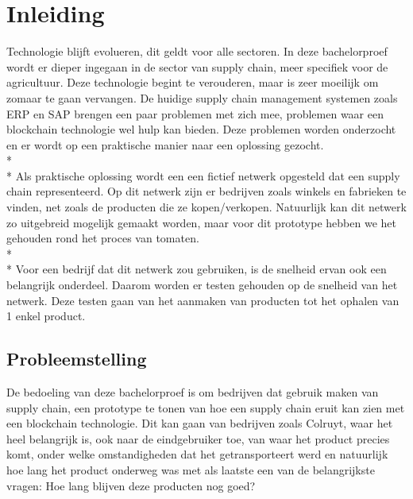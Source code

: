 
\chapter{Inleiding}
\label{ch:inleiding}

Technologie blijft evolueren, dit geldt voor alle sectoren. In deze bachelorproef wordt er dieper ingegaan in de sector van supply chain, meer specifiek voor de agricultuur. Deze technologie begint te verouderen, maar is zeer moeilijk om zomaar te gaan vervangen. De huidige supply chain management systemen zoals ERP en SAP brengen een paar problemen met zich mee, problemen waar een blockchain technologie wel hulp kan bieden. Deze problemen worden onderzocht en er wordt op een praktische manier naar een oplossing gezocht.
\\*\\*
Als praktische oplossing wordt een een fictief netwerk opgesteld dat een supply chain representeerd. Op dit netwerk zijn er bedrijven zoals winkels en fabrieken te vinden, net zoals de producten die ze kopen/verkopen. Natuurlijk kan dit netwerk zo uitgebreid mogelijk gemaakt worden, maar voor dit prototype hebben we het gehouden rond het proces van tomaten.
\\*\\*
Voor een bedrijf dat dit netwerk zou gebruiken, is de snelheid ervan ook een belangrijk onderdeel. Daarom worden er testen gehouden op de snelheid van het netwerk. Deze testen gaan van het aanmaken van producten tot het ophalen van 1 enkel product.

\section{Probleemstelling}
\label{sec:probleemstelling}

De bedoeling van deze bachelorproef is om bedrijven dat gebruik maken van supply chain, een prototype te tonen van hoe een supply chain eruit kan zien met een blockchain technologie. Dit kan gaan van bedrijven zoals Colruyt, waar het heel belangrijk is, ook naar de eindgebruiker toe, van waar het product precies komt, onder welke omstandigheden dat het getransporteert werd en natuurlijk hoe lang het product onderweg was met als laatste een van de belangrijkste vragen: Hoe lang blijven deze producten nog goed?

